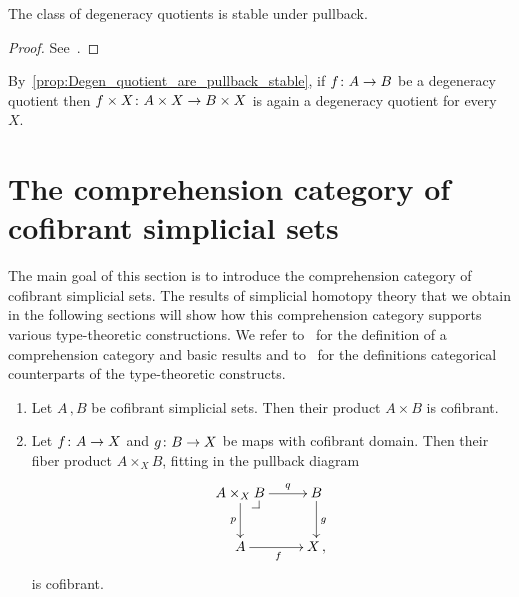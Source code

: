 \documentclass[reqno,10pt,a4paper,oneside,draft]{amsart}
\begin{document}
\begin{proposition}
\label{prop:Degen_quotient_are_pullback_stable}
The class of degeneracy quotients is stable under pullback. 
\end{proposition}

\begin{proof} See~\cite[Proposition 3.1.11]{henry2019qms}.
\end{proof}

By~\cref{prop:Degen_quotient_are_pullback_stable}, if $f \colon A \rightarrow B$ be a degeneracy quotient  then $f \times X \colon A \times X \rightarrow B \times X$ is again a degeneracy quotient for every $X$.


\section{The comprehension category of cofibrant simplicial sets}
\label{sec:basrp}

The main goal of this section is to introduce the comprehension category of cofibrant simplicial sets. The
results of simplicial homotopy theory that we obtain in the following sections will show how this 
comprehension category supports various type-theoretic constructions. We refer to~\cite{JacobsB:catltt} for the definition of a comprehension category and basic results and to~\cite{LumsdaineP:locuoc} for the
definitions categorical counterparts of the type-theoretic constructs.  


\begin{lemma}\label{lem:cofibrant_fiber_product} \hfill 
\begin{enumerate}[$(i)$] 
\item Let $A \, , B$ be cofibrant simplicial sets. Then their product $A \times B$ is cofibrant.
\item Let $f \colon A \to X$ and $g \colon B \to X$ be maps with  cofibrant domain. Then their
fiber product $A \times_X B$, fitting in the pullback diagram
\[
\xymatrix{
A \times_X B \drpullback \ar[r]^-{q} \ar[d]_-{p} & B \ar[d]^g \\
A \ar[r]_f & X \, ,}
\]
is cofibrant.
\end{enumerate}
\end{lemma}
\end{document}
